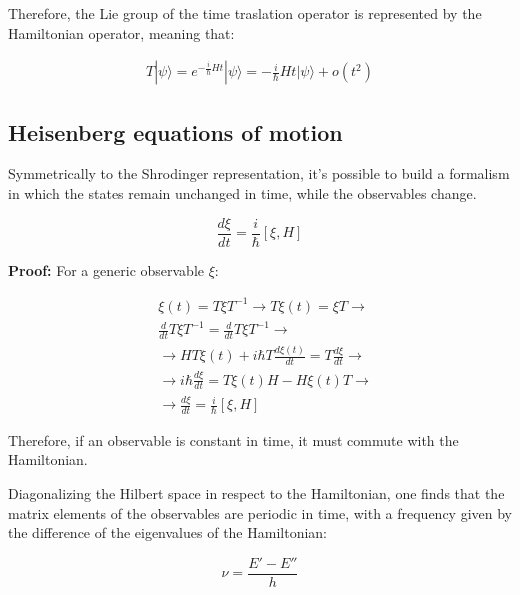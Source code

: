 \documentclass{report}
\begin{document}
Therefore, the Lie group of the time traslation operator is represented by the Hamiltonian operator,
meaning that:

\begin{align*}
  T|\psi\rangle=e^{-\frac{i}{\hbar}Ht}|\psi\rangle = -\frac{i}{\hbar}Ht|\psi\rangle+o(t^2)
\end{align*}

\subsection{Heisenberg equations of motion}

Symmetrically to the Shrodinger representation, it's possible to build a formalism in which the states remain unchanged in time,
while the observables change.

\begin{tcolorbox}[colframe=gray!50, colback=gray!10, coltitle=black, title=Heisenberg equations of motion]
  \begin{equation}
    \frac{d\xi}{dt}=\frac{i}{\hbar}[\xi,H]
  \end{equation}
\end{tcolorbox}

\textbf{Proof:}
For a generic observable $\xi$:

\begin{align*}
   & \xi (t) = T\xi T^{-1} \rightarrow T\xi (t) = \xi T \rightarrow                     \\
   & \frac{d}{dt}T\xi T^{-1} = \frac{d}{dt}T\xi T^{-1} \rightarrow                      \\
   & \rightarrow HT\xi (t) + i\hbar T\frac{d\xi (t)}{dt} = T\frac{d\xi}{dt} \rightarrow \\
   & \rightarrow i\hbar \frac{d\xi}{dt} = T\xi (t)H - H\xi (t)T \rightarrow             \\
   & \rightarrow \frac{d\xi}{dt} = \frac{i}{\hbar}[\xi,H]
\end{align*}

Therefore, if an observable is constant in time, it must commute with the Hamiltonian.




Diagonalizing the Hilbert space in respect to the Hamiltonian, one finds that the matrix elements of the observables are periodic in time, with a frequency given by the difference of the eigenvalues of the Hamiltonian:

\begin{tcolorbox}[colframe=gray!50, colback=gray!10, coltitle=black, title=Matrix elements periodicity]
  \begin{equation}
    \nu= \frac{E'-E''}{h}
  \end{equation}
\end{tcolorbox}
\end{document}

